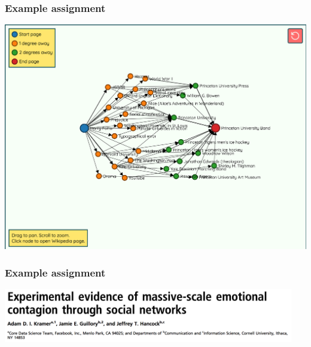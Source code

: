 \documentclass[aspectratio=169]{beamer}
\begin{document}
\begin{frame}
\frametitle{Example assignment}

\begin{center}
\includegraphics[height=0.9\textheight]{figures/six_degrees_wikipedia_example}
\end{center}

\vfill
{}

\end{frame}
\begin{frame}
\frametitle{Example assignment}

\begin{center}
\includegraphics[width=0.95\textwidth]{figures/kramer_experimental_2014_title}
\end{center}

\vfill
{}

\end{frame}
\end{document}
